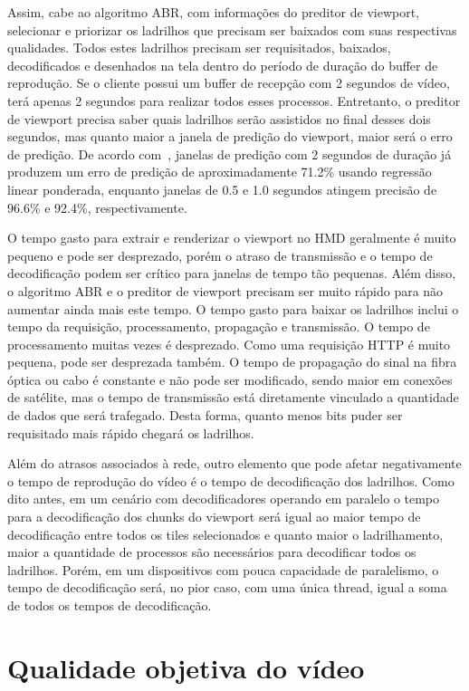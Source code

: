 Assim, cabe ao algoritmo ABR, com informações do preditor de viewport, selecionar e priorizar os ladrilhos que precisam ser baixados com suas respectivas qualidades. Todos estes ladrilhos precisam ser requisitados, baixados, decodificados e desenhados na tela dentro do período de duração do buffer de reprodução. Se o cliente possui um buffer de recepção com 2 segundos de vídeo, terá apenas 2 segundos para realizar todos esses processos. Entretanto, o preditor de viewport precisa saber quais ladrilhos serão assistidos no final desses dois segundos, mas quanto maior a janela de predição do viewport, maior será o erro de predição. De acordo com~\cite{Qian2016}, janelas de predição com 2 segundos de duração já produzem um erro de predição de aproximadamente 71.2\% usando regressão linear ponderada, enquanto janelas de 0.5 e 1.0 segundos atingem precisão de 96.6\% e 92.4\%, respectivamente.

O tempo gasto para extrair e renderizar o viewport no HMD geralmente é muito pequeno e pode ser desprezado, porém o atraso de transmissão e o tempo de decodificação podem ser crítico para janelas de tempo tão pequenas. Além disso, o algoritmo ABR e o preditor de viewport precisam ser muito rápido para não aumentar ainda mais este tempo. O tempo gasto para baixar os ladrilhos inclui o tempo da requisição, processamento, propagação e transmissão. O tempo de processamento muitas vezes é desprezado. Como uma requisição HTTP é muito pequena, pode ser desprezada também. O tempo de propagação do sinal na fibra óptica ou cabo é constante e não pode ser modificado, sendo maior em conexões de satélite, mas o tempo de transmissão está diretamente vinculado a quantidade de dados que será trafegado. Desta forma, quanto menos bits puder ser requisitado mais rápido chegará os ladrilhos.

Além do atrasos associados à rede, outro elemento que pode afetar negativamente o tempo de reprodução do vídeo é o tempo de decodificação dos ladrilhos. Como dito antes, em um cenário com decodificadores operando em paralelo o tempo para a decodificação dos chunks do viewport será igual ao maior tempo de decodificação entre todos os tiles selecionados e quanto maior o ladrilhamento, maior a quantidade de processos são necessários para decodificar todos os ladrilhos. Porém, em um dispositivos com pouca capacidade de paralelismo, o tempo de decodificação será, no pior caso, com uma única thread, igual a soma de todos os tempos de decodificação.

\section{Qualidade objetiva do vídeo}

